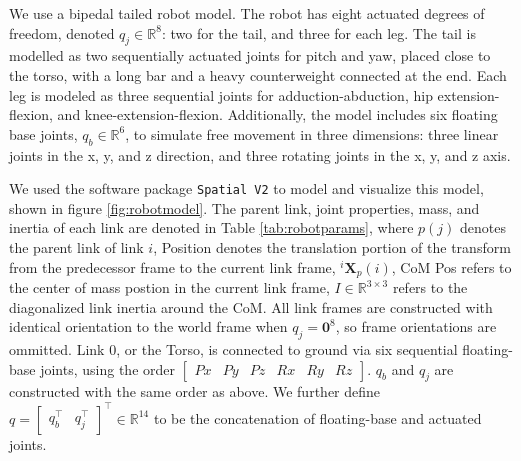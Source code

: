 \documentclass[conference]{IEEEtran}
\begin{document}
We use a bipedal tailed robot model. The robot has eight actuated degrees of freedom, denoted $q_j \in \mathbb{R}^8 $: two for the tail, and three for each leg. The tail is modelled as two sequentially actuated joints for pitch and yaw, placed close to the torso, with a long bar and a heavy counterweight connected at the end. Each leg is modeled as three sequential joints for adduction-abduction, hip extension-flexion, and knee-extension-flexion. Additionally, the model includes six floating base joints, $q_b \in \mathbb{R}^6 $,  to simulate free movement in three dimensions: three linear joints in the x, y, and z direction, and three rotating joints in the x, y, and z axis.

We used the software package \texttt{Spatial V2} \cite{spatialv2} to model and visualize this model, shown in figure \ref{fig:robotmodel}. The parent link, joint properties, mass, and inertia of each link are denoted in Table \ref{tab:robotparams}, where $p(j)$ denotes the parent link of link $i$, Position denotes the translation portion of the transform from the predecessor frame to the current link frame, $^i \mathbf{X}_p(i)$, CoM Pos refers to the center of mass postion in the current link frame, $I \in \mathbb{R}^{3 \times 3}$ refers to the diagonalized link inertia around the CoM. All link frames are constructed with identical orientation to the world frame when $q_j = \mathbf{0}^8$, so frame orientations are ommitted. Link 0, or the Torso, is connected to ground via six sequential floating-base joints, using the order $\begin{bmatrix}
    Px & Py & Pz & Rx & Ry & Rz
\end{bmatrix}$. $q_b$ and $q_j$ are constructed with the same order as above. We further define $q = \begin{bmatrix}
    q_b^\top & q_j^\top
\end{bmatrix}^\top \in \mathbb{R}^{14} $ to be the concatenation of floating-base and actuated joints.
\end{document}
